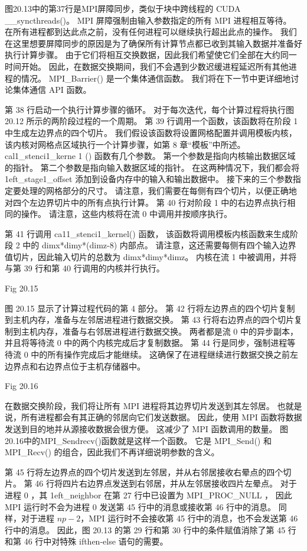 图20.13中的第37行是MPI屏障同步，类似于块中跨线程的 CUDA \_\_syncthreads()。 
MPI 屏障强制由输入参数指定的所有 MPI 进程相互等待。 在所有进程都到达此点之前，没有任何进程可以继续执行超出此点的操作。 
我们在这里想要屏障同步的原因是为了确保所有计算节点都已收到其输入数据并准备好执行计算步骤。 
由于它们将相互交换数据，因此我们希望使它们全部在大约同一时间开始。 
因此，在数据交换期间，我们不会遇到少数迟缓进程延迟所有其他进程的情况。 
MPI\_Barrier() 是一个集体通信函数。 我们将在下一节中更详细地讨论集体通信 API 函数。

第 38 行启动一个执行计算步骤的循环。 对于每次迭代，每个计算过程将执行图 20.12 所示的两阶段过程的一个周期。 
第 39 行调用一个函数，该函数将在阶段 1 中生成左边界点的四个切片。 
我们假设该函数将设置网格配置并调用模板内核，该内核对网格点区域执行一个计算步骤，如第 8 章“模板”中所述。 
cal1\_stenci1\_kerne 1 () 函数有几个参数。 
第一个参数是指向内核输出数据区域的指针。 第二个参数是指向输入数据区域的指针。 
在这两种情况下，我们都会将 1eft\_stage1\_offset 添加到设备内存中的输入和输出数据中。 
接下来的三个参数指定要处理的网格部分的尺寸。 
请注意，我们需要在每侧有四个切片，以便正确地对四个左边界切片中的所有点执行计算。 
第 40 行对阶段 1 中的右边界点执行相同的操作。 请注意，这些内核将在流 0 中调用并按顺序执行。

第 41 行调用 ca11\_stenci1\_kernel() 函数，
该函数将调用模板内核函数来生成阶段 2 中的 dimx*dimy*(dimz-8) 内部点。 
请注意，这还需要每侧有四个输入边界值切片，因此输入切片的总数为 dimx*dimy*dimz。 
内核在流 1 中被调用，并将与第 39 行和第 40 行调用的内核并行执行。

{\color{red} Fig 20.15}

图 20.15 显示了计算过程代码的第 4 部分。 第 42 行将左边界点的四个切片复制到主机内存，准备与左邻居进程进行数据交换。 
第 43 行将右边界点的四个切片复制到主机内存，准备与右邻居进程进行数据交换。 
两者都是流 0 中的异步副本，并且将等待流 0 中的两个内核完成后才复制数据。 
第 44 行是同步，强制进程等待流 0 中的所有操作完成后才能继续。 
这确保了在进程继续进行数据交换之前左边界点和右边界点位于主机存储器中。

{\color{red} Fig 20.16}

在数据交换阶段，我们将让所有 MPI 进程将其边界切片发送到其左邻居。 也就是说，所有进程都会有其正确的邻居向它们发送数据。 
因此，使用 MPI 函数将数据发送到目的地并从源接收数据会很方便。 这减少了 MPI 函数调用的数量。 
图20.16中的MPI\_Sendrecv()函数就是这样一个函数。 
它是 MPI\_Send() 和 MPI\_Recv() 的组合，因此我们不再详细说明参数的含义。

第 45 行将左边界点的四个切片发送到左邻居，并从右邻居接收右晕点的四个切片。 
第 46 行将四片右边界点发送到右邻居，并从左邻居接收四片左晕点。 
对于进程 0 ，其 1eft\_neighbor 在第 27 行中已设置为 MPI\_PROC\_NULL ，
因此 MPI 运行时不会为进程 0 发送第 45 行中的消息或接收第 46 行中的消息。 
同样，对于进程 $n p-2$，MPI 运行时不会接收第 45 行中的消息，也不会发送第 46 行中的消息。 
因此，图 20.13 的第 29 行和第 30 行中的条件赋值消除了第 45 行和第 46 行中对特殊 ifthen-else 语句的需要。

